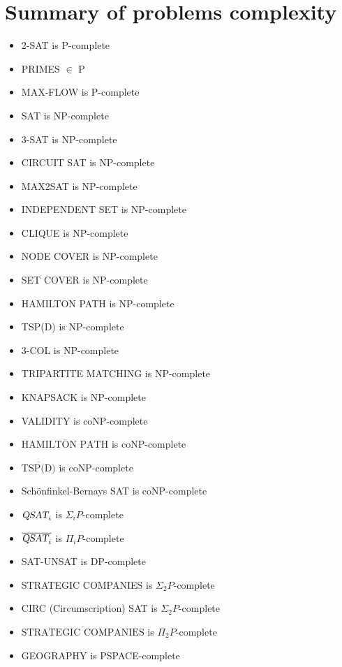 \section{Summary of problems complexity}
\begin{itemize}
    \item 2-SAT is P-complete
    \item PRIMES $\in$ P
    \item MAX-FLOW is P-complete
    \item SAT is NP-complete
    \item 3-SAT is NP-complete
    \item CIRCUIT SAT is NP-complete
    \item MAX2SAT is NP-complete
    \item INDEPENDENT SET is NP-complete
    \item CLIQUE is NP-complete
    \item NODE COVER is NP-complete
    \item SET COVER is NP-complete
    \item HAMILTON PATH is NP-complete
    \item TSP(D) is NP-complete
    \item 3-COL is NP-complete
    \item TRIPARTITE MATCHING is NP-complete
    \item KNAPSACK is NP-complete
    \item VALIDITY is coNP-complete
    \item $\overline{\text{HAMILTON PATH}}$ is coNP-complete
    \item $\overline{\text{TSP(D)}}$ is coNP-complete
    \item Schönfinkel-Bernays SAT is coNP-complete
    \item $\textsl{QSAT}_i$ is $\Sigma_iP$-complete
    \item $\overline{\textsl{QSAT}_i}$ is $\Pi_iP$-complete
    \item SAT-UNSAT is DP-complete
    \item STRATEGIC COMPANIES is $\Sigma_2P$-complete
    \item CIRC (Circumscription) SAT is $\Sigma_2P$-complete
    \item $\overline{\text{STRATEGIC COMPANIES}}$ is $\Pi_2P$-complete
    \item GEOGRAPHY is PSPACE-complete
\end{itemize}